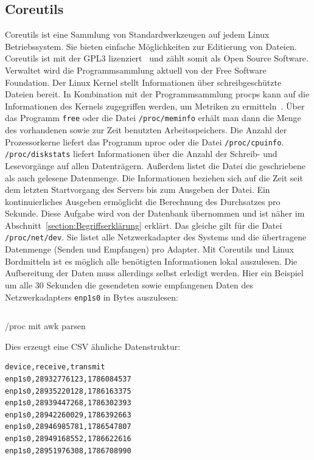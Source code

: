 \subsection{Coreutils}
Coreutils ist eine Sammlung von Standardwerkzeugen auf jedem Linux
Betriebssystem. Sie bieten einfache Möglichkeiten zur Editierung von Dateien.
Coreutils ist mit der GPL3 lizenziert~\cite{coreutils} und zählt somit als Open
Source Software. Verwaltet wird die Programmsammlung aktuell von der Free
Software Foundation. Der Linux Kernel stellt Informationen über
schreibgeschützte Dateien bereit. In Kombination mit der Programmsammlung
procps kann auf die Informationen des Kernels zugegriffen werden, um Metriken
zu ermitteln~\cite{procps}. Über das Programm \texttt{free} oder die Datei
\texttt{/proc/meminfo} erhält man dann die Menge des vorhandenen sowie zur Zeit
benutzten Arbeitsspeichers. Die Anzahl der Prozessorkerne liefert das Programm
nproc oder die Datei \texttt{/proc/cpuinfo}. \texttt{/proc/diskstats} liefert
Informationen über die Anzahl der Schreib- und Lesevorgänge auf allen
Datenträgern. Außerdem listet die Datei die geschriebene als auch gelesene
Datenmenge. Die Informationen beziehen sich auf die Zeit seit dem letzten
Startvorgang des Servers bis zum Ausgeben der Datei. Ein kontinuierliches
Ausgeben ermöglicht die Berechnung des Durchsatzes pro Sekunde. Diese Aufgabe
wird von der Datenbank übernommen und ist näher im
Abschnitt~\ref{section:Begriffserklärung} erklärt. Das gleiche gilt für die
Datei \texttt{/proc/net/dev}. Sie listet alle Netzwerkadapter des Systems und
die übertragene Datenmenge (Senden und Empfangen) pro Adapter. Mit Coreutils
und Linux Bordmitteln ist es möglich alle benötigten Informationen lokal
auszulesen. Die Aufbereitung der Daten muss allerdings selbst erledigt werden.
Hier ein Beispiel um alle 30 Sekunden die gesendeten sowie empfangenen Daten
des Netzwerkadapters \texttt{enp1s0} in Bytes auszulesen:

\begin{listing}
  \inputminted{bash}{../listings/coreutils-awk.txt}
  \caption{/proc mit awk parsen}
  \label{lst:aw}
\end{listing}

Dies erzeugt eine \gls{CSV} ähnliche Datenstruktur:

\begin{lstlisting}[language=bash,caption={traffic stats enp1s0}]
device,receive,transmit
enp1s0,28932776123,1786084537
enp1s0,28935220128,1786163375
enp1s0,28939447268,1786302393
enp1s0,28942260029,1786392663
enp1s0,28946985781,1786547807
enp1s0,28949168552,1786622616
enp1s0,28951976308,1786708990
\end{lstlisting}


